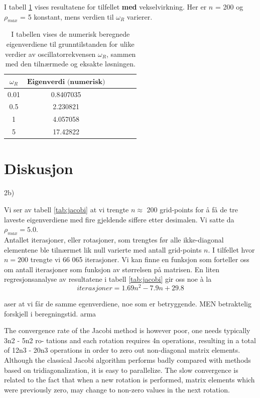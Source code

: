 \documentclass{article}
\begin{document}
I tabell \ref{tab:jacobi_interact} vises resultatene for tilfellet \textbf{med} vekselvirkning. Her er $n$ = 200 og $\rho_{max}$ = 5 konstant, mens verdien til $\omega_R$ varierer. 

\FloatBarrier
\begin{table}[!ht]
\centering
\caption{I tabellen vises de numerisk beregnede eigenverdiene til grunntilstanden for ulike verdier av oscillatorrekvensen $\omega_R$, sammen med den tilnærmede og eksakte løsningen.}
\label{tab:jacobi_interact}
\begin{tabular}{|c|c|c|c|c|c|}
\hline
$\omega_R$  &  $\textbf{Eigenverdi (numerisk)}$   \\ 
\hline
0.01     & 0.8407035     \\ 
\hline
0.5 & 2.230821           \\ 
\hline
1 & 4.057058       \\ 
\hline
5 & 17.42822    \\ 
\hline   
\end{tabular}
\end{table}
\FloatBarrier

\section{Diskusjon}
2b)

Vi ser av tabell \ref{tab:jacobi} at vi trengte $n \approx$ 200 grid-points for å få de tre laveste eigenverdiene med fire gjeldende siffere etter desimalen. Vi satte da $\rho_{max} = 5.0$.\\

Antallet iterasjoner, eller rotasjoner, som trengtes før alle ikke-diagonal elementene ble tilnærmet lik null varierte med antall grid-points $n$. I tilfellet hvor $n = 200$ trengte vi 66 065 iterasjoner. Vi kan finne en funksjon som forteller oss om antall iterasjoner som funksjon av størrelsen på matrisen. En liten regresjonsanalyse av resultatene i tabell \ref{tab:jacobi} gir oss noe à la
\[ iterasjoner = 1.69n^2 - 7.9n + 29.8 \] 

aser at vi får de samme egenverdiene, noe som er betryggende. MEN betraktelig forskjell i beregningstid. arma

The convergence rate of the Jacobi method is however poor, one needs typically 3n2 - 5n2 ro- tations and each rotation requires 4n operations, resulting in a total of 12n3 - 20n3 operations in order to zero out non-diagonal matrix elements. Although the classical Jacobi algorithm performs badly compared with methods based on tridiagonalization, it is easy to parallelize.
The slow convergence is related to the fact that when a new rotation is performed, matrix elements which were previously zero, may change to non-zero values in the next rotation.
\end{document}
